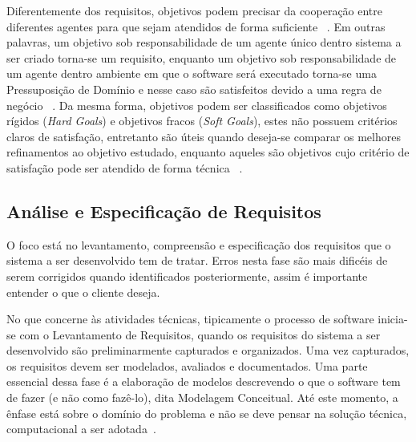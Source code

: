 Diferentemente dos requisitos, objetivos podem precisar da cooperação entre diferentes agentes para que sejam atendidos de forma suficiente ~\cite{dardenne1993goal}. Em outras palavras, um objetivo sob responsabilidade de um agente único dentro sistema a ser criado torna-se um requisito, enquanto um objetivo sob responsabilidade de um agente dentro ambiente em que o software será executado torna-se uma Pressuposição de Domínio e nesse caso são satisfeitos devido a uma regra de negócio ~\cite{van2001goal, van1998managing}. Da mesma forma, objetivos podem ser classificados como objetivos rígidos (\textit{Hard Goals}) e objetivos fracos (\textit{Soft Goals}), estes não possuem critérios claros de satisfação, entretanto são úteis quando deseja-se comparar os melhores refinamentos ao objetivo estudado, enquanto aqueles são objetivos cujo critério de satisfação pode ser atendido de forma técnica ~\cite{dardenne1993goal}.





\subsection{Análise e Especificação de Requisitos}
\label{sec-referencial-engenharia-software-atividade-desenvolvimento-analise-especificacao-requisisto}

O foco está no levantamento, compreensão e especificação dos requisitos que o sistema a ser desenvolvido tem de tratar.  Erros nesta fase são mais dificéis de serem corrigidos quando identificados posteriormente, assim é importante entender o que o cliente deseja.%

No que concerne às atividades técnicas, tipicamente o processo de software inicia-se com o Levantamento de Requisitos, quando os requisitos do sistema a ser desenvolvido são preliminarmente capturados e organizados. Uma vez capturados, os requisitos devem ser modelados, avaliados e documentados. Uma parte essencial dessa fase é a elaboração de modelos descrevendo o que o software tem de fazer (e não como fazê-lo), dita Modelagem Conceitual. Até este momento, a ênfase está sobre o domínio do problema e não se deve pensar na solução técnica, computacional a ser adotada~\cite{falboEngReq}.

